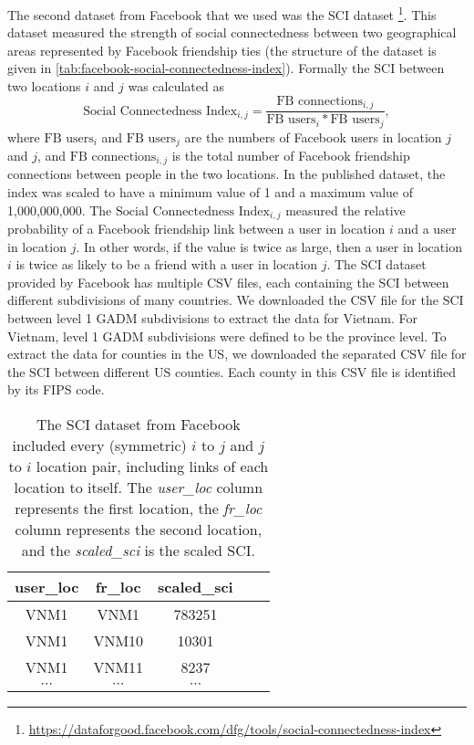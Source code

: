 The second dataset from Facebook that we used was the \gls{SCI} dataset \footnote{\url{https://dataforgood.facebook.com/dfg/tools/social-connectedness-index}}.
This dataset measured the strength of social connectedness between two geographical areas represented by Facebook friendship ties (the structure of the dataset is given in \autoref{tab:facebook-social-connectedness-index}).
Formally the \gls{SCI} between two locations $i$ and $j$ was calculated as
\begin{equation*}
    \text{Social Connectedness Index}_{i,j} = \frac{\text{FB connections}_{i,j}}{\text{FB users}_i * \text{FB users}_j},
\end{equation*}
where $\text{FB users}_i$ and $\text{FB users}_j$ are the numbers of Facebook users in location $j$ and $j$, and $\text{FB connections}_{i,j}$ is the total number of Facebook friendship connections between people in the two locations.
In the published dataset, the index was scaled to have a minimum value of 1 and a maximum value of 1,000,000,000.
The $\text{Social Connectedness Index}_{i,j}$ measured the relative probability of a Facebook friendship link between a user in location $i$ and a user in location $j$.
In other words, if the value is twice as large, then a user in location $i$ is twice as likely to be a friend with a user in location $j$.
The \gls{SCI} dataset provided by Facebook has multiple \gls{CSV} files, each containing the \gls{SCI} between different subdivisions of many countries.
We downloaded the \gls{CSV} file for the \gls{SCI} between level 1 \gls{GADM} subdivisions to extract the data for Vietnam.
For Vietnam, level 1 \gls{GADM} subdivisions were defined to be the province level.
To extract the data for counties in the \gls{US}, we downloaded the separated \gls{CSV} file for the \gls{SCI} between different \gls{US} counties.
Each county in this \gls{CSV} file is identified by its \gls{FIPS} code.

\begin{table}[h]
\centering
\begin{tabular}{| c | c | c | c | c |}
    user\_loc & fr\_loc & scaled\_sci \\
    \hline\hline
    VNM1 & VNM1 & 783251 \\
    \hline
    VNM1 & VNM10 & 10301 \\
    \hline
    VNM1 & VNM11 & 8237 \\
    \hline
    $\cdots$ & $\cdots$ & $\cdots$ \\
\end{tabular}
\caption{The \gls{SCI} dataset from Facebook included every (symmetric) $i$ to $j$ and $j$ to $i$ location pair, including links of each location to itself. The \textit{user\_loc} column represents the first location, the \textit{fr\_loc} column represents the second location, and the \textit{scaled\_sci} is the scaled \gls{SCI}.}
\label{tab:facebook-social-connectedness-index}
\end{table}

